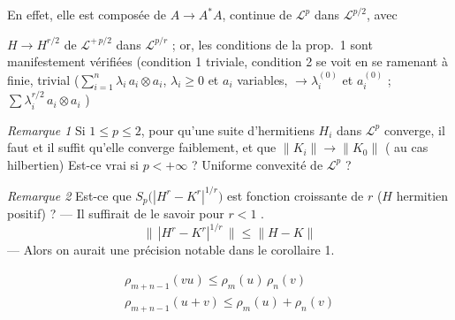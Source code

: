 \documentclass[11pt,a4paper]{article}
\begin{document}
En effet, elle est composée de $A \to A^{*}A$, continue de $\mathcal{L}^p$ dans $\mathcal{L}^{p/2}$, avec

$H \to H^{r/2}$ de $\mathcal{L}^{+\,p/2}$ dans $\mathcal{L}^{p/r}$ ; or, les conditions de la prop.~1 sont manifestement vérifiées \struck{\ill{}} (condition 1 triviale, condition 2 se voit  en se ramenant à \struck{\ill{}}  finie,  trivial  ($\sum_{i=1}^{n} \lambda_i\, a_i \otimes a_i$, $\lambda_i \geq 0$ et $a_i$ variables, $\to \lambda_i^{(0)}$ et $a_i^{(0)}$ ; \ill{}  $\sum \lambda_i^{r/2}\, a_i \otimes a_i$ \ill{}) 

\emph{Remarque 1} Si $1 \leq p \leq 2$, pour qu'une suite d'hermitiens $H_i$ dans $\mathcal{L}^p$   converge, il faut et il suffit qu'elle converge faiblement, et que $\|K_i\| \to \|K_0\|$  (   au cas hilbertien) Est-ce vrai si $p < +\infty$ ? Uniforme convexité de $\mathcal{L}^p$ ?

\emph{Remarque 2} Est-ce que $S_p\bigl(|H^r - K^r|^{1/r}\bigr)$ est fonction croissante de $r$ ($H$ hermitien positif) ? --- Il suffirait de le savoir pour $r < 1$ \ill{}.
\[
  \bigl\|\,|H^r - K^r|^{1/r}\,\bigr\| \leq \|H - K\|
\]
--- Alors on aurait une précision notable dans le corollaire 1.

\marginal{\ill{}} 

\begin{gather*}
  \rho_{m+n-1}(vu) \leq \rho_m(u)\, \rho_n(v) \\
  \rho_{m+n-1}(u+v) \leq \rho_m(u) + \rho_n(v)
\end{gather*}
 
\end{document}
